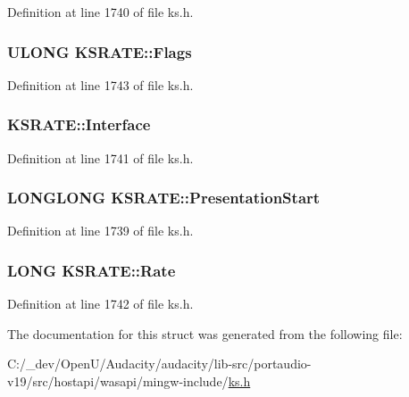 Definition at line 1740 of file ks.\+h.

\subsubsection[{\texorpdfstring{Flags}{Flags}}]{\setlength{\rightskip}{0pt plus 5cm}U\+L\+O\+NG K\+S\+R\+A\+T\+E\+::\+Flags}\hypertarget{struct_k_s_r_a_t_e_a923895bbb2239bc347876c9c8757b951}{}\label{struct_k_s_r_a_t_e_a923895bbb2239bc347876c9c8757b951}


Definition at line 1743 of file ks.\+h.

\subsubsection[{\texorpdfstring{Interface}{Interface}}]{ K\+S\+R\+A\+T\+E\+::\+Interface}\hypertarget{struct_k_s_r_a_t_e_a655776cb0b496e7250a982dd3b96d373}{}\label{struct_k_s_r_a_t_e_a655776cb0b496e7250a982dd3b96d373}


Definition at line 1741 of file ks.\+h.

\subsubsection[{\texorpdfstring{Presentation\+Start}{PresentationStart}}]{\setlength{\rightskip}{0pt plus 5cm}L\+O\+N\+G\+L\+O\+NG K\+S\+R\+A\+T\+E\+::\+Presentation\+Start}\hypertarget{struct_k_s_r_a_t_e_a673440bbf1666ffc11037efa7eb1a5c4}{}\label{struct_k_s_r_a_t_e_a673440bbf1666ffc11037efa7eb1a5c4}


Definition at line 1739 of file ks.\+h.

\subsubsection[{\texorpdfstring{Rate}{Rate}}]{\setlength{\rightskip}{0pt plus 5cm}L\+O\+NG K\+S\+R\+A\+T\+E\+::\+Rate}\hypertarget{struct_k_s_r_a_t_e_a0a82bb725433fcbe5576284e060dc565}{}\label{struct_k_s_r_a_t_e_a0a82bb725433fcbe5576284e060dc565}


Definition at line 1742 of file ks.\+h.



The documentation for this struct was generated from the following file\+:\begin{DoxyCompactItemize}
\item 
C\+:/\+\_\+dev/\+Open\+U/\+Audacity/audacity/lib-\/src/portaudio-\/v19/src/hostapi/wasapi/mingw-\/include/\hyperlink{ks_8h}{ks.\+h}\end{DoxyCompactItemize}
